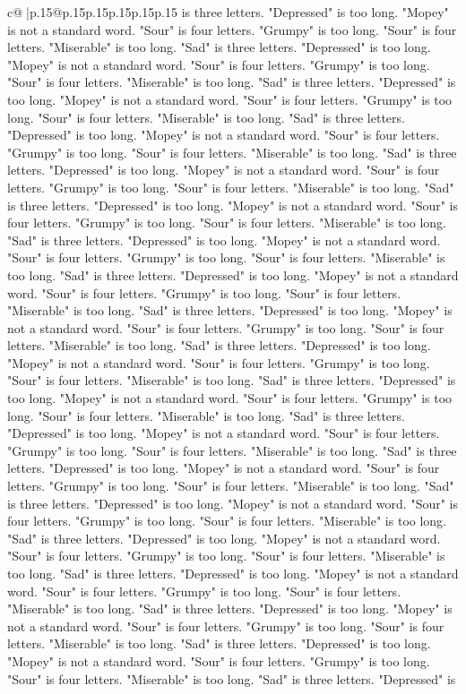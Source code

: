 \documentclass{article}
\begin{document}
{\begin{supertabular}{c@{$\;$}|p{.15\linewidth}@{}p{.15\linewidth}p{.15\linewidth}p{.15\linewidth}p{.15\linewidth}p{.15\linewidth}}
{{{is three letters. "Depressed" is too long. "Mopey" is not a standard word. "Sour" is four letters. "Grumpy" is too long. "Sour" is four letters. "Miserable" is too long. "Sad" is three letters. "Depressed" is too long. "Mopey" is not a standard word. "Sour" is four letters. "Grumpy" is too long. "Sour" is four letters. "Miserable" is too long. "Sad" is three letters. "Depressed" is too long. "Mopey" is not a standard word. "Sour" is four letters. "Grumpy" is too long. "Sour" is four letters. "Miserable" is too long. "Sad" is three letters. "Depressed" is too long. "Mopey" is not a standard word. "Sour" is four letters. "Grumpy" is too long. "Sour" is four letters. "Miserable" is too long. "Sad" is three letters. "Depressed" is too long. "Mopey" is not a standard word. "Sour" is four letters. "Grumpy" is too long. "Sour" is four letters. "Miserable" is too long. "Sad" is three letters. "Depressed" is too long. "Mopey" is not a standard word. "Sour" is four letters. "Grumpy" is too long. "Sour" is four letters. "Miserable" is too long. "Sad" is three letters. "Depressed" is too long. "Mopey" is not a standard word. "Sour" is four letters. "Grumpy" is too long. "Sour" is four letters. "Miserable" is too long. "Sad" is three letters. "Depressed" is too long. "Mopey" is not a standard word. "Sour" is four letters. "Grumpy" is too long. "Sour" is four letters. "Miserable" is too long. "Sad" is three letters. "Depressed" is too long. "Mopey" is not a standard word. "Sour" is four letters. "Grumpy" is too long. "Sour" is four letters. "Miserable" is too long. "Sad" is three letters. "Depressed" is too long. "Mopey" is not a standard word. "Sour" is four letters. "Grumpy" is too long. "Sour" is four letters. "Miserable" is too long. "Sad" is three letters. "Depressed" is too long. "Mopey" is not a standard word. "Sour" is four letters. "Grumpy" is too long. "Sour" is four letters. "Miserable" is too long. "Sad" is three letters. "Depressed" is too long. "Mopey" is not a standard word. "Sour" is four letters. "Grumpy" is too long. "Sour" is four letters. "Miserable" is too long. "Sad" is three letters. "Depressed" is too long. "Mopey" is not a standard word. "Sour" is four letters. "Grumpy" is too long. "Sour" is four letters. "Miserable" is too long. "Sad" is three letters. "Depressed" is too long. "Mopey" is not a standard word. "Sour" is four letters. "Grumpy" is too long. "Sour" is four letters. "Miserable" is too long. "Sad" is three letters. "Depressed" is too long. "Mopey" is not a standard word. "Sour" is four letters. "Grumpy" is too long. "Sour" is four letters. "Miserable" is too long. "Sad" is three letters. "Depressed" is too long. "Mopey" is not a standard word. "Sour" is four letters. "Grumpy" is too long. "Sour" is four letters. "Miserable" is too long. "Sad" is three letters. "Depressed" is too long. "Mopey" is not a standard word. "Sour" is four letters. "Grumpy" is too long. "Sour" is four letters. "Miserable" is too long. "Sad" is three letters. "Depressed" is too long. "Mopey" is not a standard word. "Sour" is four letters. "Grumpy" is too long. "Sour" is four letters. "Miserable" is too long. "Sad" is three letters. "Depressed" is }}}
\end{supertabular}}
\end{document}
